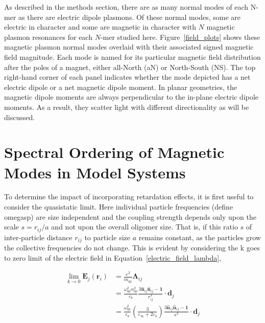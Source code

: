 \documentclass[journal=apchd5,manuscript=article]{achemso}
\begin{document}
As described in the methods section, there are as many normal modes of each N-mer as there are electric dipole plasmons. Of these normal modes, some are electric in character and some are magnetic in character with $N$ magnetic plasmon resonances for each $N$-mer studied here. Figure~\ref{field_plots} shows these magnetic plasmon normal modes overlaid with their associated signed magnetic field magnitude. Each mode is named for its particular magnetic field distribution after the poles of a magnet, either all-North (aN) or North-South (NS). The top right-hand corner of each panel indicates whether the  mode depicted has a net electric dipole or a net magnetic dipole moment. In planar geometries, the magnetic dipole moments are always perpendicular to the in-plane electric dipole moments. As a result, they scatter light with different directionality as will be discussed.

\section{Spectral Ordering of Magnetic Modes in Model Systems}

To determine the impact of incorporating retardation effects, it is first useful to consider the quasistatic limit. Here individual particle frequencies (define omegasp) are size independent and the coupling strength depends only upon the scale $s = r_{ij}/a$ and not upon the overall oligomer size. That is, if this ratio $s$ of inter-particle distance $r_{ij}$ to particle size $a$ remains constant, as the particles grow the collective frequencies do not change. This is evident by considering the k goes to zero limit of the electric field in Equation~\ref{electric_field_lambda},

\begin{equation}
\begin{aligned}
\lim_{k \to 0}\textbf{E}_j(\textbf{r}_i) &= \frac{e^2}{m_{\textrm{sp}}}\boldsymbol{\Lambda}_{ij}\\ 
&= \frac{\omega_{\textrm{sp}}^2 \alpha_{\textrm{sp}}^2}{\varepsilon_b}\frac{3\hat{\textbf{n}}_{ij}\hat{\textbf{n}}_{ij} - \textbf{1}}{r_{ij}^3} \cdot \textbf{d}_j \\
&= \frac{\omega_{\textrm{sp}}^2}{\varepsilon_b} \left(\frac{3}{\varepsilon_{\infty}+2\varepsilon_b}\right)\frac{3\hat{\textbf{n}}_{ij}\hat{\textbf{n}}_{ij} - \textbf{1}}{s^3} \cdot \textbf{d}_j
\end{aligned}
\label{quasistatic_coupling}
\end{equation}
\end{document}
